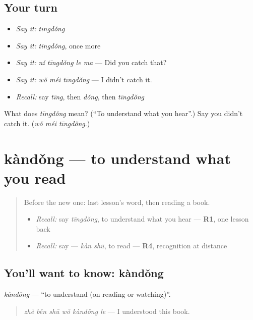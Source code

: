 \subsection*{Your turn}
\begin{itemize}
\raggedright
  \item \emph{Say it:} \emph{tīngdǒng}
  \item \emph{Say it:} \emph{tīngdǒng}, once more
  \item \emph{Say it:} \emph{nǐ tīngdǒng le ma} — Did you catch that?
  \item \emph{Say it:} \emph{wǒ méi tīngdǒng} — I didn't catch it.
  \item \emph{Recall:} say \emph{tīng}, then \emph{dǒng}, then \emph{tīngdǒng}
\end{itemize}

\begin{tcolorbox}[breakable,colback=teal!4,colframe=teal!35!black,title={Before you move on}]
What does \emph{tīngdǒng} mean? (\textquotedblleft{}To understand what you hear\textquotedblright{}.) Say you didn't catch it. (\emph{wǒ méi tīngdǒng}.)
\end{tcolorbox}
\section[kàndǒng]{kàndǒng — to understand what you read}

\label{lesson:ZH-C151-kandong}



\begin{quote}
Before the new one: last lesson's word, then reading a book.

\begin{itemize}
\raggedright
  \item \emph{Recall:} say \emph{tīngdǒng}, to understand what you hear — \textbf{R1}, one lesson back
  \item \emph{Recall:} say  — \emph{kàn shū}, to read — \textbf{R4}, recognition at distance
\end{itemize}
\end{quote}

\subsection*{You'll want to know: kàndǒng}
\emph{kàndǒng} — \textquotedblleft{}to understand (on reading or watching)\textquotedblright{}.

\begin{quote}
\emph{zhè běn shū wǒ kàndǒng le} — I understood this book.
\end{quote}

